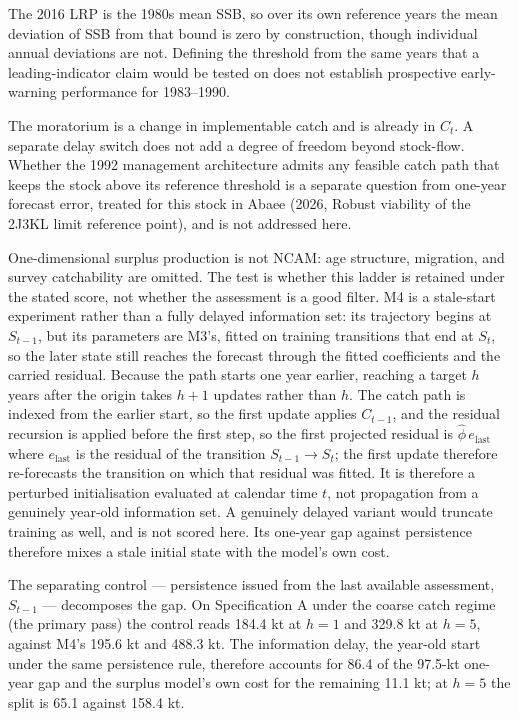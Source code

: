 \documentclass[11pt]{article}
\begin{document}
The 2016 LRP is the 1980s mean SSB, so over its own reference years the
mean deviation of SSB from that bound is zero by construction, though
individual annual deviations are not. Defining the threshold from the
same years that a leading-indicator claim would be tested on does not
establish prospective early-warning performance for 1983--1990.

The moratorium is a change in implementable catch and is already in
\(C_t\). A separate delay switch does not add a degree of freedom beyond
stock-flow. Whether the 1992 management architecture admits any feasible
catch path that keeps the stock above its reference threshold is a
separate question from one-year forecast error, treated for this stock
in Abaee (2026, Robust viability of the 2J3KL limit reference point), and is not addressed
here.

One-dimensional surplus production is not NCAM: age structure,
migration, and survey catchability are omitted. The test is whether this
ladder is retained under the stated score, not whether the assessment is
a good filter. M4 is a stale-start experiment rather than a fully delayed information
set: its trajectory begins at \(S_{t-1}\), but its parameters are
M3's, fitted on training transitions that end at \(S_t\), so the
later state still reaches the forecast through the fitted coefficients
and the carried residual. Because the path starts one year earlier,
reaching a target \(h\) years after the origin takes \(h+1\) updates
rather than \(h\). The catch path is indexed from the earlier start, so
the first update applies \(C_{t-1}\), and the residual recursion is
applied before the first step, so the first projected residual is
\(\hat\phi\,e_{\mathrm{last}}\) where \(e_{\mathrm{last}}\) is the
residual of the transition \(S_{t-1}\to S_t\); the first update
therefore re-forecasts the transition on which that residual was fitted.
It is therefore a perturbed
initialisation evaluated at calendar time \(t\), not propagation from a
genuinely year-old information set. A genuinely delayed variant would truncate
training as well, and is not scored here. Its one-year gap against
persistence therefore mixes a stale initial state with the model's own
cost.

The separating control --- persistence issued from the last available
assessment, \(S_{t-1}\) --- decomposes the gap. On Specification A under
the coarse catch regime (the primary pass) the control reads 184.4 kt at
\(h = 1\) and 329.8 kt at \(h = 5\), against M4's 195.6 kt and 488.3 kt.
The information delay, the year-old start under the same persistence
rule, therefore accounts for 86.4 of the 97.5-kt one-year gap and the
surplus model's own cost for the remaining 11.1 kt; at \(h = 5\) the
split is 65.1 against 158.4 kt.
\end{document}
